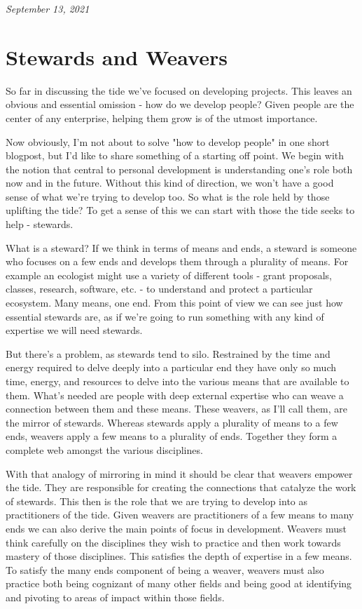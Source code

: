 \documentclass[10pt,a5paper]{book}
\begin{document}
\textit{September 13, 2021}

\section{Stewards and Weavers}
So far in discussing the tide we've focused on developing projects. This leaves an obvious and essential omission - how do we develop people? Given people are the center of any enterprise, helping them grow is of the utmost importance. 

Now obviously, I'm not about to solve "how to develop people" in one short blogpost, but I'd like to share something of a starting off point. We begin with the notion that central to personal development is understanding one's role both now and in the future. Without this kind of direction, we won't have a good sense of what we're trying to develop too. So what is the role held by those uplifting the tide? To get a sense of this we can start with those the tide seeks to help - stewards.

What is a steward? If we think in terms of means and ends, a steward is someone who focuses on a few ends and develops them through a plurality of means. For example an ecologist might use a variety of different tools - grant proposals, classes, research, software, etc. - to understand and protect a particular ecosystem. Many means, one end. From this point of view we can see just how essential stewards are, as if we're going to run something with any kind of expertise we will need stewards. 

But there's a problem, as stewards tend to silo. Restrained by the time and energy required to delve deeply into a particular end they have only so much time, energy, and resources to delve into the various means that are available to them. What's needed are people with deep external expertise who can weave a connection between them and these means. These weavers, as I'll call them, are the mirror of stewards. Whereas stewards apply a plurality of means to a few ends, weavers apply a few means to a plurality of ends. Together they form a complete web amongst the various disciplines. 

With that analogy of mirroring in mind it should be clear that weavers empower the tide. They are responsible for creating the connections that catalyze the work of stewards. This then is the role that we are trying to develop into as practitioners of the tide. Given weavers are practitioners of a few means to many ends we can also derive the main points of focus in development. Weavers must think carefully on the disciplines they wish to practice and then work towards mastery of those disciplines. This satisfies the depth of expertise in a few means. To satisfy the many ends component of being a weaver, weavers must also practice both being cognizant of many other fields and being good at identifying and pivoting to areas of impact within those fields. 
\end{document}
